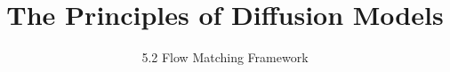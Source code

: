 
\title{The Principles of Diffusion Models}
\subtitle{5.2 Flow Matching Framework}


\begin{frame}
    \titlepage
\end{frame}


